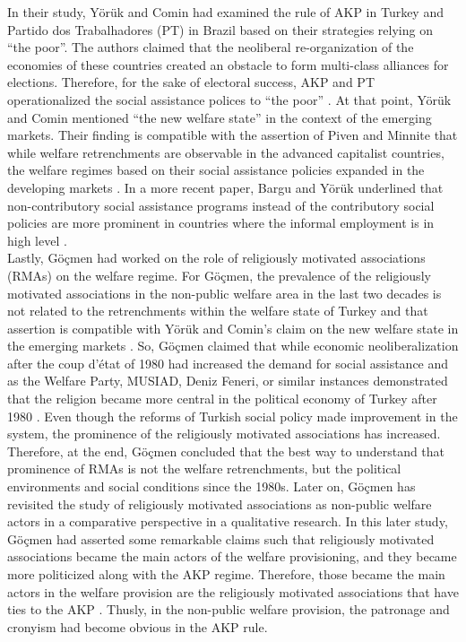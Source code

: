 \documentclass[11pt]{article}
\begin{document}
\noindent In their study, Yörük and Comin had examined the rule of AKP in Turkey and Partido dos Trabalhadores (PT) in Brazil based on their strategies relying on “the poor”. The authors claimed that the neoliberal re-organization of the economies of these countries created an obstacle to form multi-class alliances for elections. Therefore, for the sake of electoral success, AKP and PT operationalized the social assistance polices to “the poor” \cite{yoruk2020electoral}. At that point, Yörük and Comin mentioned “the new welfare state” in the context of the emerging markets. Their finding is compatible with the assertion of Piven and Minnite that while welfare retrenchments are observable in the advanced capitalist countries, the welfare regimes based on their social assistance policies expanded in the developing markets \cite{yoruk2020electoral, pivenminnite:2015}. In a more recent paper, Bargu and Yörük underlined that non-contributory social assistance programs instead of the contributory social policies are more prominent in countries where the informal employment is in high level \cite{yorukbargu:2021}. \\

\noindent Lastly, Göçmen had worked on the role of religiously motivated associations (RMAs) on the welfare regime. For Göçmen, the prevalence of the religiously motivated associations in the non-public welfare area in the last two decades is not related to the retrenchments within the welfare state of Turkey and that assertion is compatible with Yörük and Comin’s claim on the new welfare state in the emerging markets \cite{goccmen2014religion}. So, Göçmen claimed that while economic neoliberalization after the coup d’état of 1980 had increased the demand for social assistance and as the Welfare Party, MUSIAD, Deniz Feneri, or similar instances demonstrated that the religion became more central in the political economy of Turkey after 1980 \cite{goccmen2014religion}. Even though the reforms of Turkish social policy made improvement in the system, the prominence of the religiously motivated associations has increased. Therefore, at the end, Göçmen concluded that the best way to understand that prominence of RMAs is not the welfare retrenchments, but the political environments and social conditions since the 1980s. Later on, Göçmen has revisited the study of religiously motivated associations as non-public welfare actors in a comparative perspective in a qualitative research. In this later study, Göçmen had asserted some remarkable claims such that religiously motivated associations became the main actors of the welfare provisioning, and they became more politicized along with the AKP regime. Therefore, those became the main actors in the welfare provision are the religiously motivated associations that have ties to the AKP \cite{goccmen2018non}. Thusly, in the non-public welfare provision, the patronage and cronyism had become obvious in the AKP rule.
\end{document}

